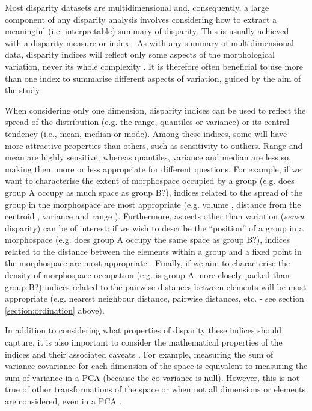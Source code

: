 \documentclass[12pt,letterpaper]{article}
\begin{document}
Most disparity datasets are multidimensional and, consequently, a large component of any disparity analysis involves considering how to extract a meaningful (i.e. interpretable) summary of disparity.
This is usually achieved with a disparity measure or index \citep{Hopkins2017-cf}.
As with any summary of multidimensional data, disparity indices will reflect only some aspects of the morphological variation, never its whole complexity \citep{GuillermeMOMS}.
It is therefore often beneficial to use more than one index to summarise different aspects of variation, guided by the aim of the study.

When considering only one dimension, disparity indices can be used to reflect the spread of the distribution (e.g. the range, quantiles or variance) or its central tendency (i.e., mean, median or mode).
Among these indices, some will have more attractive properties than others, such as sensitivity to outliers. Range and mean are highly sensitive, whereas quantiles, variance and median are less so, making them more or less appropriate for different questions.
For example, if we want to characterise the extent of morphospace occupied by a group (e.g. does group A occupy as much space as group B?), indices related to the spread of the group in the morphospace are most appropriate (e.g. volume
\citealt{Diaz2016-mr}, distance from the centroid \citealt{Hopkins2017-cf, Finlay2015-ft}, variance and range \citealt{Brusatte2008-fx}).
Furthermore, aspects other than variation (\textit{sensu} disparity) can be of interest: if we wish to describe the ``position'' of a group in a morphospace (e.g. does group A occupy the same space as group B?), indices related to the distance between the elements within a group and a fixed point in the morphospace are most appropriate \citep{GuillermeMOMS}.
Finally, if we aim to characterise the density of morphospace occupation (e.g. is group A more closely packed than group B?) indices related to the pairwise distances between elements will be most appropriate (e.g. nearest neighbour distance, pairwise distances, etc. \citealt{Close2015-qi} - see section \ref{section:ordination} above).

In addition to considering what properties of disparity these indices should capture, it is also important to consider the mathematical properties of the indices and their associated caveats \citep{Wills2001-wh, Ciampaglio2001-iz}.
For example, measuring the sum of variance-covariance for each dimension of the space is equivalent to measuring the sum of variance in a PCA (because the co-variance is null).
However, this is not true of other transformations of the space or when not all dimensions or elements are considered, even in a PCA \citep{Legendre2012-va}.
\end{document}
